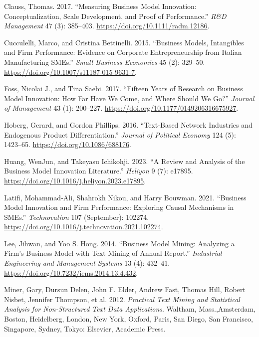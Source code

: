 \documentclass[
]{article}
\newlength{\cslhangindent}
\newenvironment{CSLReferences}[2] %
 {\begin{list}{}{%
  \setlength{\itemindent}{0pt}
  \setlength{\leftmargin}{0pt}
  \setlength{\parsep}{0pt}
  \ifodd #1
   \setlength{\leftmargin}{\cslhangindent}
   \setlength{\itemindent}{-1\cslhangindent}
  \fi
  \setlength{\itemsep}{#2\baselineskip}}}
 {\end{list}}
\begin{document}
\label{refs}
\begin{CSLReferences}{1}{0}
Clauss, Thomas. 2017. {``Measuring Business Model Innovation:
Conceptualization, Scale Development, and Proof of Performance.''}
\emph{R\&D Management} 47 (3): 385--403.
\url{https://doi.org/10.1111/radm.12186}.

Cucculelli, Marco, and Cristina Bettinelli. 2015. {``Business Models,
Intangibles and Firm Performance: Evidence on Corporate Entrepreneurship
from {Italian} Manufacturing {SMEs}.''} \emph{Small Business Economics}
45 (2): 329--50. \url{https://doi.org/10.1007/s11187-015-9631-7}.

Foss, Nicolai J., and Tina Saebi. 2017. {``Fifteen {Years} of {Research}
on {Business} {Model} {Innovation}: {How} {Far} {Have} {We} {Come}, and
{Where} {Should} {We} {Go}?''} \emph{Journal of Management} 43 (1):
200--227. \url{https://doi.org/10.1177/0149206316675927}.

Hoberg, Gerard, and Gordon Phillips. 2016. {``Text-{Based} {Network}
{Industries} and {Endogenous} {Product} {Differentiation}.''}
\emph{Journal of Political Economy} 124 (5): 1423--65.
\url{https://doi.org/10.1086/688176}.

Huang, WenJun, and Takeyasu Ichikohji. 2023. {``A Review and Analysis of
the Business Model Innovation Literature.''} \emph{Heliyon} 9 (7):
e17895. \url{https://doi.org/10.1016/j.heliyon.2023.e17895}.

Latifi, Mohammad-Ali, Shahrokh Nikou, and Harry Bouwman. 2021.
{``Business Model Innovation and Firm Performance: {Exploring} Causal
Mechanisms in {SMEs}.''} \emph{Technovation} 107 (September): 102274.
\url{https://doi.org/10.1016/j.technovation.2021.102274}.

Lee, Jihwan, and Yoo S. Hong. 2014. {``Business {Model} {Mining}:
{Analyzing} a {Firm}'s {Business} {Model} with {Text} {Mining} of
{Annual} {Report}.''} \emph{Industrial Engineering and Management
Systems} 13 (4): 432--41.
\url{https://doi.org/10.7232/iems.2014.13.4.432}.

Miner, Gary, Dursun Delen, John F. Elder, Andrew Fast, Thomas Hill,
Robert Nisbet, Jennifer Thompson, et al. 2012. \emph{Practical Text
Mining and Statistical Analysis for Non-Structured Text Data
Applications}. Waltham, Mass.,Amsterdam, Boston, Heidelberg, London, New
York, Oxford, Paris, San Diego, San Francisco, Singapore, Sydney, Tokyo:
Elsevier, Academic Press.


\end{CSLReferences}
\end{document}
